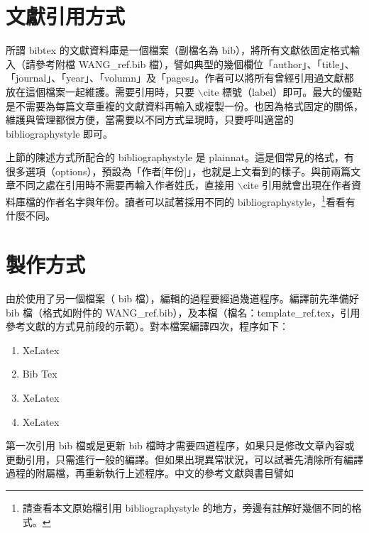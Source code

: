 \section{文獻引用方式}
所謂 bibtex 的文獻資料庫是一個檔案（副檔名為 bib），將所有文獻依固定格式輸入（請參考附檔 WANG\_ref.bib 檔），譬如典型的幾個欄位「author」、「title」、「journal」、「year」、「volumn」及「pages」。作者可以將所有曾經引用過文獻都放在這個檔案一起維護。需要引用時，只要 $\backslash$cite 標號（label）即可。最大的優點是不需要為每篇文章重複的文獻資料再輸入或複製一份。也因為格式固定的關係，維護與管理都很方便，當需要以不同方式呈現時，只要呼叫適當的 bibliographystyle 即可。

上節的陳述方式所配合的 bibliographystyle 是 {\E plainnat}。這是個常見的格式，有很多選項（options），預設為「作者[年份]」，也就是上文看到的樣子。與前兩篇文章不同之處在引用時不需要再輸入作者姓氏，直接用 $\backslash$cite 引用就會出現在作者資料庫檔的作者名字與年份。讀者可以試著採用不同的 bibliographystyle，\footnote{請查看本文原始檔引用 bibliographystyle 的地方，旁邊有註解好幾個不同的格式。}看看有什麼不同。

\section{製作方式}
由於使用了另一個檔案（ bib 檔），編輯的過程要經過幾道程序。編譯前先準備好 bib 檔（格式如附件的  WANG\_ref.bib），及本檔（檔名：template\_ref.tex，引用參考文獻的方式見前段的示範）。對本檔案編譯四次，程序如下：

\begin{enumerate}
\item XeLatex
\item Bib Tex
\item XeLatex
\item XeLatex
\end{enumerate}


第一次引用 bib 檔或是更新 bib 檔時才需要四道程序，如果只是修改文章內容或更動引用，只需進行一般的編譯。但如果出現異常狀況，可以試著先清除所有編譯過程的附屬檔，再重新執行上述程序。中文的參考文獻與書目譬如 \cite{WANG:2018}

%
%
%

%
%





